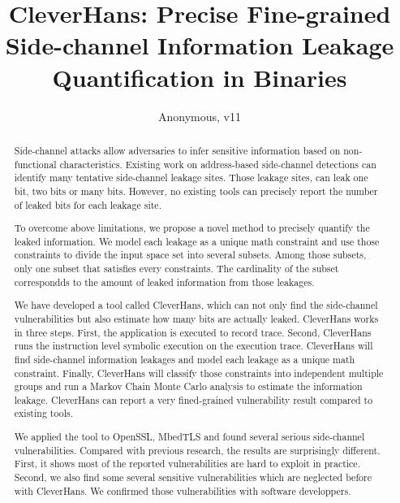 \documentclass[conference]{IEEEtran}
\newcommand{\tool}{TANA}
\renewcommand{\tool}{CleverHans}
\begin{document}
\title{\tool{}: Precise Fine-grained Side-channel Information Leakage Quantification in Binaries}
\author{Anonymous, v11}

\maketitle

\begin{abstract}
    Side-channel attacks allow adversaries to infer sensitive
    information based on non-functional characteristics. 
    Existing work on address-based side-channel detections can identify 
    many tentative side-channel leakage sites. Those leakage sites, can
    leak one bit, two bits or many bits. However, no existing tools can
    precisely report the number of leaked bits for each leakage site.
       
    To overcome above limitations, we propose a novel method
    to precisely quantify the leaked information. We model each 
    leakage as a unique math constraint and use those
    constraints to divide the input space set into several subsets.
    Among those subsets, only one subset that satisfies every constraints.
    The cardinality of the subset correspondds to the amount of leaked
    information from those leakages. 


    We have developed a tool called \tool{}, which can not only 
    find the side-channel vulnerabilities but also estimate how many bits are actually leaked. 
    \tool{} works in three steps. First, the application is executed to record 
    trace. Second, \tool{} runs the instruction level symbolic execution on the 
    execution trace. \tool{} will find side-channel information leakages and model each leakage 
    as a unique math constraint. Finally, \tool{} will classify those constraints into 
    independent multiple groups and run a Markov Chain Monte Carlo analysis to estimate the 
    information leakage. \tool{} can report a very fined-grained vulnerability result 
    compared to existing tools.
    
    We applied the tool to OpenSSL, MbedTLS and found several serious side-channel 
    vulnerabilities. Compared with previous research, the results are surprisingly different. 
    First, it shows most of the reported vulnerabilities are hard to exploit in practice. 
    Second, we also find some several sensitive vulnerabilities which are neglected before with \tool{}. 
    We confirmed those vulnerabilities with software developpers.

\end{abstract}

\IEEEpeerreviewmaketitle
{}














\end{document}
